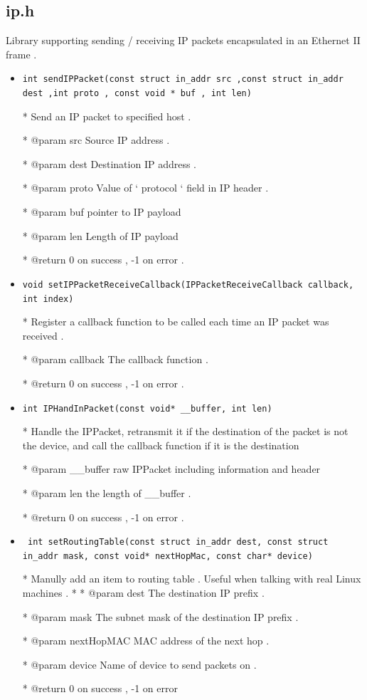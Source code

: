 \documentclass[11pt]{article}
\begin{document}
	\subsection*{ip.h}
	
	\par Library supporting sending / receiving IP packets encapsulated	in an Ethernet II frame .
	
	\begin{itemize}
		\item \texttt{int sendIPPacket(const struct in\_addr src ,const struct in\_addr dest ,int proto , const void * buf , int len)} 
		
		* Send an IP packet to specified host .
		
		* @param src Source IP address .
		
		* @param dest Destination IP address .
		
		* @param proto Value of ‘ protocol ‘ field in IP header .
		
		* @param buf pointer to IP payload
		
		* @param len Length of IP payload
		
		* @return 0 on success , -1 on error .
		
		 \item \texttt{void setIPPacketReceiveCallback(IPPacketReceiveCallback callback, int index)}
		 
		 * Register a callback function to be called each time an IP
		 packet was received .
		 
		 * @param callback The callback function .
		 
		 * @return 0 on success , -1 on error .
		
		\item \texttt{int IPHandInPacket(const void* \_\_buffer, int len)}
		
		* Handle the IPPacket, retransmit it if the destination of the packet is not the device,
		and call the callback function if it is the destination
		
		* @param \_\_buffer raw IPPacket including information and header
		
		* @param len the length of \_\_buffer .
		
		* @return 0 on success , -1 on error .
		
		\item \texttt{
			int setRoutingTable(const struct in\_addr dest, const struct in\_addr mask,
			const void* nextHopMac, const char* device)}
			
			* Manully add an item to routing table . Useful when talking
			with real Linux machines .
			*
			* @param dest The destination IP prefix .
			
			* @param mask The subnet mask of the destination IP prefix .
			
			* @param nextHopMAC MAC address of the next hop .
			
			* @param device Name of device to send packets on .
			
			* @return 0 on success , -1 on error
	\end{itemize}
	
\end{document}

